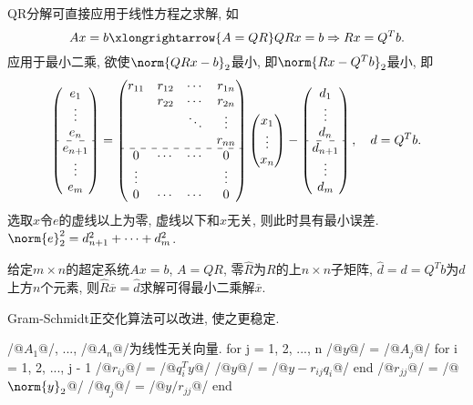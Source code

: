 \documentclass{ctexart}
\begin{document}
QR分解可直接应用于线性方程之求解, 如
\[ Ax = b \xlongrightarrow{A=QR} QRx = b \Rightarrow Rx = Q^Tb. \]
应用于最小二乘, 欲使$\norm{QRx-b}_2$最小, 即$\norm{Rx-Q^Tb}_2$最小, 即
\[ \begin{pmatrix}
    e_1 \\ \vdots \\ e_n \\\hdashline e_{n+1} \\ \vdots \\ e_m
\end{pmatrix} = \begin{pmatrix}
    r_{11} & r_{12} & \cdots & r_{1n} \\
    & r_{22} & \cdots & r_{2n} \\
    & & \ddots & \vdots \\
    & & & r_{nn} \\
    \hdashline
    0 & \cdots & \cdots & 0 \\
    \vdots & & & \vdots \\
    0 & \cdots & \cdots & 0
\end{pmatrix}\begin{pmatrix}
    x_1 \\ \vdots \\ x_n
\end{pmatrix} - \begin{pmatrix}
    d_1 \\ \vdots \\ d_n \\ \hdashline d_{n+1} \\ \vdots \\d_{m}
\end{pmatrix},\quad d = Q^Tb. \]
选取$x$令$e$的虚线以上为零, 虚线以下和$x$无关, 则此时具有最小误差. $\norm{e}_2^2 = d_{n+1}^2 + \cdots + d_{m}^2$.
\begin{theorem}
    给定$m\times n$的超定系统$Ax = b$, $A = QR$, 零$\hat R$为$R$的上$n\times n$子矩阵, $\hat d = d = Q^Tb$为$d$上方$n$个元素, 则$\hat R\overbar x = \hat d$求解可得最小二乘解$\overbar{x}$.
\end{theorem}
Gram-Schmidt正交化算法可以改进, 使之更稳定.
\begin{matlablst}
/@$A_1$@/, ..., /@$A_n$@/为线性无关向量.
for j = 1, 2, ..., n
    /@$y$@/ = /@$A_j$@/
    for i = 1, 2, ..., j - 1
        /@$r_{ij}$@/ = /@$q_i^T y$@/
        /@$y$@/ = /@$y - r_{ij}q_i$@/
    end
    /@$r_{jj}$@/ = /@$\norm{y}_2$@/
    /@$q_j$@/ = /@$y/r_{jj}$@/
end
\end{matlablst}
\end{document}
